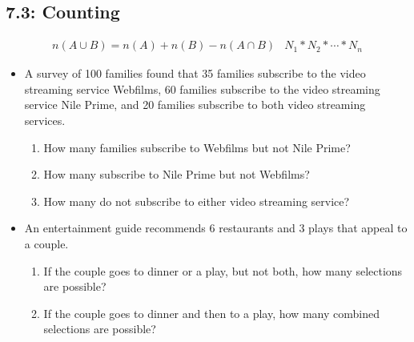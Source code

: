 \documentclass[12pt]{article}
\begin{document}
\subsection*{7.3: Counting}
\begin{align*}
	&n(A\cup B) = n(A) + n(B) - n(A\cap B) &  N_1 * N_2 * \cdots * N_n&
\end{align*}
\begin{itemize}
	\item A survey of 100 families found that 35 families subscribe to the video streaming service Webfilms, 60 families subscribe to the video streaming service Nile Prime, and 20 families subscribe to both video streaming services.
	\begin{enumerate}
		\item How many families subscribe to Webfilms but not Nile Prime?
		\item How many subscribe to Nile Prime but not Webfilms?
		\item How many do not subscribe to either video streaming service?
	\end{enumerate}
	\item An entertainment guide recommends 6 restaurants and 3 plays that appeal to a couple.
	\begin{enumerate}
		\item If the couple goes to dinner or a play, but not both, how many selections are possible?
		\item If the couple goes to dinner and then to a play, how many combined selections are possible?
	\end{enumerate}
\end{itemize}
\end{document}
